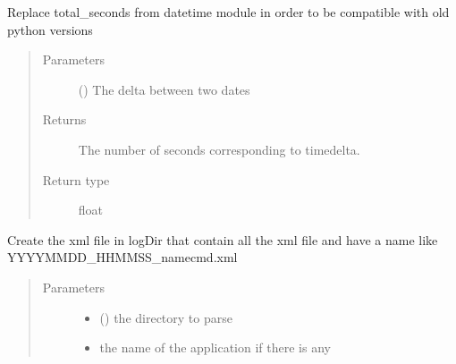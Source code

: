 \documentclass[a4paper,10pt,english]{sphinxmanual}
\begin{document}
\begin{fulllineitems}
\label{\detokenize{commands/apidoc/src:src.logger.timedelta_total_seconds}}
Replace total\_seconds from datetime module 
in order to be compatible with old python versions
\begin{quote}\begin{description}
\item[{Parameters}] \leavevmode
{} () \textendash{} The delta between two dates

\item[{Returns}] \leavevmode
The number of seconds corresponding to timedelta.

\item[{Return type}] \leavevmode
float

\end{description}\end{quote}

\end{fulllineitems}


\begin{fulllineitems}
\label{\detokenize{commands/apidoc/src:src.logger.update_hat_xml}}
Create the xml file in logDir that contain all the xml file 
and have a name like YYYYMMDD\_HHMMSS\_namecmd.xml
\begin{quote}\begin{description}
\item[{Parameters}] \leavevmode\begin{itemize}
\item {} 
 () \textendash{} the directory to parse

\item {} 
 \textendash{} the name of the application if there is any

\end{itemize}

\end{description}\end{quote}

\end{fulllineitems}
\end{document}
